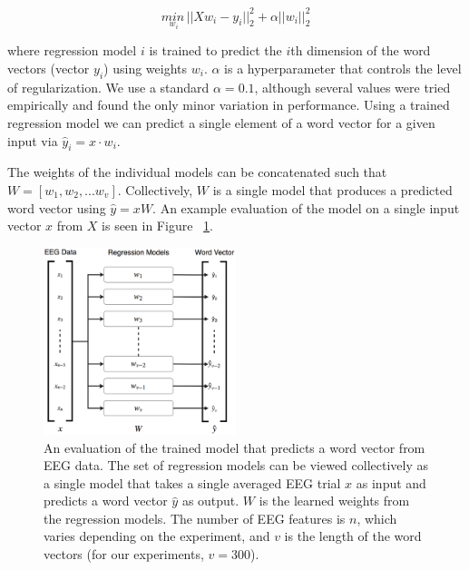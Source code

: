 \begin{equation}
  \underset{w_i}{min\,} {|| X w_i - y_i||_2^2 + \alpha ||w_i||_2^2}
  \label{eq:ridge}
\end{equation}

\noindent where regression model $i$ is trained to predict the $i$th dimension of the word vectors (vector $y_i$) using weights $w_i$. $\alpha$ is a hyperparameter that controls the level of regularization. We use a standard $\alpha = 0.1$, although several values were tried empirically and found the only minor variation in performance. Using a trained regression model we can predict a single element of a word vector for a given input via $\hat{y}_i = x \cdot w_i$.

The weights of the individual models can be concatenated such that $W = [ w_1, w_2, ... w_v ]$. Collectively, $W$ is a single model that produces a predicted word vector using $\hat{y} = xW$. An example evaluation of the model on a single input vector $x$ from $X$ is seen in Figure ~\ref{fig:features}.

\begin{figure}[t]
  \centering
  \includegraphics[width=0.5\textwidth]{figures/features}
  \caption{An evaluation of the trained model that predicts a word vector from EEG data. The set of regression models can be viewed collectively as a single model that takes a single averaged EEG trial $x$ as input and predicts a word vector $\hat{y}$ as output. $W$ is the learned weights from the regression models. The number of EEG features is $n$, which varies depending on the experiment, and $v$ is the length of the word vectors (for our experiments, $v=300$).}
  \label{fig:features}
\end{figure}

